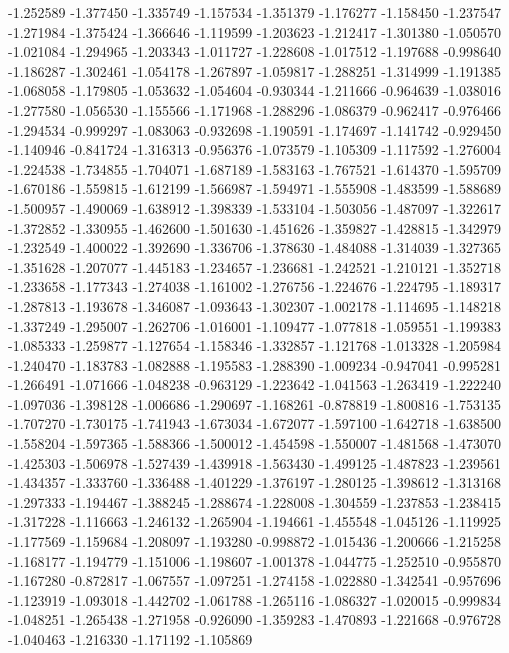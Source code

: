 -1.252589
-1.377450
-1.335749
-1.157534
-1.351379
-1.176277
-1.158450
-1.237547
-1.271984
-1.375424
-1.366646
-1.119599
-1.203623
-1.212417
-1.301380
-1.050570
-1.021084
-1.294965
-1.203343
-1.011727
-1.228608
-1.017512
-1.197688
-0.998640
-1.186287
-1.302461
-1.054178
-1.267897
-1.059817
-1.288251
-1.314999
-1.191385
-1.068058
-1.179805
-1.053632
-1.054604
-0.930344
-1.211666
-0.964639
-1.038016
-1.277580
-1.056530
-1.155566
-1.171968
-1.288296
-1.086379
-0.962417
-0.976466
-1.294534
-0.999297
-1.083063
-0.932698
-1.190591
-1.174697
-1.141742
-0.929450
-1.140946
-0.841724
-1.316313
-0.956376
-1.073579
-1.105309
-1.117592
-1.276004
-1.224538
-1.734855
-1.704071
-1.687189
-1.583163
-1.767521
-1.614370
-1.595709
-1.670186
-1.559815
-1.612199
-1.566987
-1.594971
-1.555908
-1.483599
-1.588689
-1.500957
-1.490069
-1.638912
-1.398339
-1.533104
-1.503056
-1.487097
-1.322617
-1.372852
-1.330955
-1.462600
-1.501630
-1.451626
-1.359827
-1.428815
-1.342979
-1.232549
-1.400022
-1.392690
-1.336706
-1.378630
-1.484088
-1.314039
-1.327365
-1.351628
-1.207077
-1.445183
-1.234657
-1.236681
-1.242521
-1.210121
-1.352718
-1.233658
-1.177343
-1.274038
-1.161002
-1.276756
-1.224676
-1.224795
-1.189317
-1.287813
-1.193678
-1.346087
-1.093643
-1.302307
-1.002178
-1.114695
-1.148218
-1.337249
-1.295007
-1.262706
-1.016001
-1.109477
-1.077818
-1.059551
-1.199383
-1.085333
-1.259877
-1.127654
-1.158346
-1.332857
-1.121768
-1.013328
-1.205984
-1.240470
-1.183783
-1.082888
-1.195583
-1.288390
-1.009234
-0.947041
-0.995281
-1.266491
-1.071666
-1.048238
-0.963129
-1.223642
-1.041563
-1.263419
-1.222240
-1.097036
-1.398128
-1.006686
-1.290697
-1.168261
-0.878819
-1.800816
-1.753135
-1.707270
-1.730175
-1.741943
-1.673034
-1.672077
-1.597100
-1.642718
-1.638500
-1.558204
-1.597365
-1.588366
-1.500012
-1.454598
-1.550007
-1.481568
-1.473070
-1.425303
-1.506978
-1.527439
-1.439918
-1.563430
-1.499125
-1.487823
-1.239561
-1.434357
-1.333760
-1.336488
-1.401229
-1.376197
-1.280125
-1.398612
-1.313168
-1.297333
-1.194467
-1.388245
-1.288674
-1.228008
-1.304559
-1.237853
-1.238415
-1.317228
-1.116663
-1.246132
-1.265904
-1.194661
-1.455548
-1.045126
-1.119925
-1.177569
-1.159684
-1.208097
-1.193280
-0.998872
-1.015436
-1.200666
-1.215258
-1.168177
-1.194779
-1.151006
-1.198607
-1.001378
-1.044775
-1.252510
-0.955870
-1.167280
-0.872817
-1.067557
-1.097251
-1.274158
-1.022880
-1.342541
-0.957696
-1.123919
-1.093018
-1.442702
-1.061788
-1.265116
-1.086327
-1.020015
-0.999834
-1.048251
-1.265438
-1.271958
-0.926090
-1.359283
-1.470893
-1.221668
-0.976728
-1.040463
-1.216330
-1.171192
-1.105869
